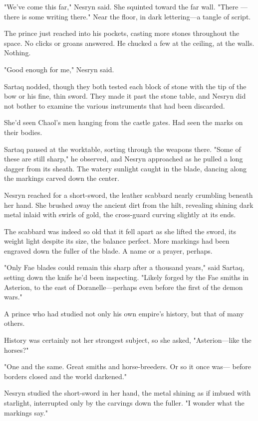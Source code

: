 "We've come this far," Nesryn said.
She squinted toward the far wall.
"There ---there is some writing there."
Near the floor, in dark lettering---a tangle of script.

The prince just reached into his pockets, casting more stones throughout the space.
No clicks or groans answered.
He chucked a few at the ceiling, at the walls.
Nothing.

"Good enough for me," Nesryn said.

Sartaq nodded, though they both tested each block of stone with the tip of the bow or his fine, thin sword.
They made it past the stone table, and Nesryn did not bother to examine the various instruments that had been discarded.

She'd seen Chaol's men hanging from the castle gates.
Had seen the marks on their bodies.

Sartaq paused at the worktable, sorting through the weapons there.
"Some of these are still sharp," he observed, and Nesryn approached as he pulled a long dagger from its sheath.
The watery sunlight caught in the blade, dancing along the markings carved down the center.

Nesryn reached for a short-sword, the leather scabbard nearly crumbling beneath her hand.
She brushed away the ancient dirt from the hilt, revealing shining dark metal inlaid with swirls of gold, the cross-guard curving slightly at its ends.

The scabbard was indeed so old that it fell apart as she lifted the sword, its weight light despite its size, the balance perfect.
More markings had been engraved down the fuller of the blade.
A name or a prayer, perhaps.

"Only Fae blades could remain this sharp after a thousand years," said Sartaq, setting down the knife he'd been inspecting.
"Likely forged by the Fae smiths in Asterion, to the east of Doranelle---perhaps even before the first of the demon wars."

A prince who had studied not only his own empire's history, but that of many others.

History was certainly not her strongest subject, so she asked, "Asterion---like the horses?"

"One and the same.
Great smiths and horse-breeders.
Or so it once was--- before borders closed and the world darkened."

Nesryn studied the short-sword in her hand, the metal shining as if imbued with starlight, interrupted only by the carvings down the fuller.
"I wonder what the markings say."

